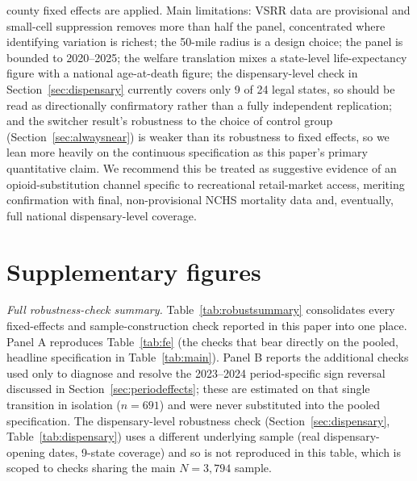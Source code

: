 \documentclass[preprint,12pt,authoryear]{elsarticle}
\begin{document}
county fixed effects are applied. Main
limitations: VSRR data are provisional and small-cell suppression
removes more than half the panel, concentrated where identifying
variation is richest; the 50-mile radius is a design choice; the panel
is bounded to 2020--2025; the welfare translation mixes a state-level
life-expectancy figure with a national age-at-death figure; the
dispensary-level check in Section~\ref{sec:dispensary} currently
covers only 9 of 24 legal states, so should be read as directionally
confirmatory rather than a fully independent replication; and the
switcher result's robustness to the choice of control group
(Section~\ref{sec:alwaysnear}) is weaker than its robustness to fixed
effects, so we lean more heavily on the continuous specification as
this paper's primary quantitative claim. We recommend this be treated
as suggestive evidence of an opioid-substitution channel specific to
recreational retail-market access, meriting confirmation with final,
non-provisional NCHS mortality data and, eventually, full
national dispensary-level coverage.

\appendix
\section{Supplementary figures}
\label{sec:appendix}

\noindent\emph{Full robustness-check summary.} Table~\ref{tab:robustsummary}
consolidates every fixed-effects and sample-construction check reported
in this paper into one place. Panel A reproduces Table~\ref{tab:fe}
(the checks that bear directly on the pooled, headline specification
in Table~\ref{tab:main}). Panel B reports the additional checks used
only to diagnose and resolve the 2023--2024 period-specific sign
reversal discussed in Section~\ref{sec:periodeffects}; these are
estimated on that single transition in isolation ($n=691$) and were
never substituted into the pooled specification. The dispensary-level
robustness check (Section~\ref{sec:dispensary}, Table~\ref{tab:dispensary})
uses a different underlying sample (real dispensary-opening dates,
9-state coverage) and so is not reproduced in this table, which is
scoped to checks sharing the main $N=3{,}794$ sample.
\end{document}
